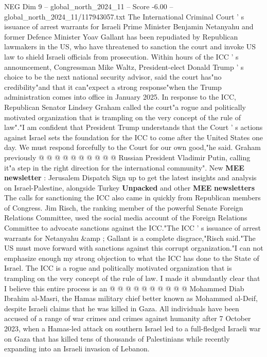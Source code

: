 \begin{textsample}{NEG Dim 9 – global\_north\_2024\_11 – Score -6.00 – global\_north\_2024\_11/117943057.txt}  \label{ex:f9_neg_053}
The International Criminal Court ' s issuance of arrest warrants for Israeli Prime Minister Benjamin Netanyahu and former Defence Minister Yoav Gallant has been repudiated by Republican lawmakers in the US, who have threatened to sanction the court and invoke US law to shield Israeli officials from prosecution.
Within hours of the ICC ' s announcement, Congressman Mike Waltz, President-elect Donald Trump ' s choice to be the next national security advisor, said the court has"no credibility"and that it can"expect a strong response"when the Trump administration comes into office in January 2025.
In response to the ICC, Republican Senator Lindsey Graham called the court"a rogue and politically motivated organization that is trampling on the very concept of the rule of law"."I am confident that President Trump understands that the Court ' s actions against Israel sets the foundation for the ICC to come after the United States one day.
We must respond forcefully to the Court for our own good,"he said.
Graham previously @ @ @ @ @ @ @ @ @ @ Russian President Vladimir Putin, calling it"a step in the right direction for the international community".
New \textbf{MEE} \textbf{newsletter} : Jerusalem Dispatch Sign up to get the latest insights and analysis on Israel-Palestine, alongside Turkey \textbf{Unpacked} and other \textbf{MEE} \textbf{newsletters} The calls for sanctioning the ICC also came in quickly from Republican members of Congress.
Jim Risch, the ranking member of the powerful Senate Foreign Relations Committee, used the social media account of the Foreign Relations Committee to advocate sanctions against the ICC."The ICC ' s issuance of arrest warrants for Netanyahu \&amp ; Gallant is a complete disgrace,"Risch said."The US must move forward with sanctions against this corrupt organization."I can not emphasize enough my strong objection to what the ICC has done to the State of Israel.
The ICC is a rogue and politically motivated organization that is trampling on the very concept of the rule of law.
I made it abundantly clear that I believe this entire process is an @ @ @ @ @ @ @ @ @ @ Mohammed Diab Ibrahim al-Masri, the Hamas military chief better known as Mohammed al-Deif, despite Israeli claims that he was killed in Gaza.
All individuals have been accused of a range of war crimes and crimes against humanity after 7 October 2023, when a Hamas-led attack on southern Israel led to a full-fledged Israeli war on Gaza that has killed tens of thousands of Palestinians while recently expanding into an Israeli invasion of Lebanon.

\end{textsample}
